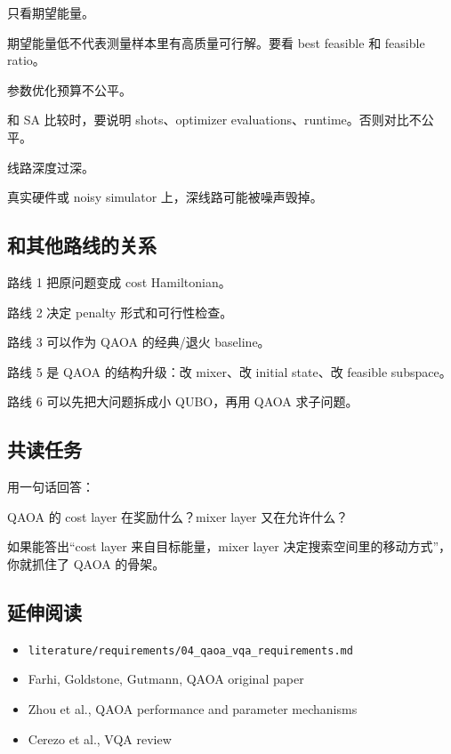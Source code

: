\documentclass[UTF8,12pt,a4paper]{ctexart}
\begin{document}
只看期望能量。

期望能量低不代表测量样本里有高质量可行解。要看 best feasible 和 feasible ratio。

参数优化预算不公平。

和 SA 比较时，要说明 shots、optimizer evaluations、runtime。否则对比不公平。

线路深度过深。

真实硬件或 noisy simulator 上，深线路可能被噪声毁掉。

\subsection*{和其他路线的关系}

路线 1 把原问题变成 cost Hamiltonian。

路线 2 决定 penalty 形式和可行性检查。

路线 3 可以作为 QAOA 的经典/退火 baseline。

路线 5 是 QAOA 的结构升级：改 mixer、改 initial state、改 feasible subspace。

路线 6 可以先把大问题拆成小 QUBO，再用 QAOA 求子问题。

\subsection*{共读任务}

用一句话回答：

\begin{GuideVerbatim}
QAOA 的 cost layer 在奖励什么？mixer layer 又在允许什么？
\end{GuideVerbatim}

如果能答出“cost layer 来自目标能量，mixer layer 决定搜索空间里的移动方式”，你就抓住了 QAOA 的骨架。

\subsection*{延伸阅读}

\begin{itemize}
\item \texttt{literature/requirements/04\_qaoa\_vqa\_requirements.md}
\item Farhi, Goldstone, Gutmann, QAOA original paper
\item Zhou et al., QAOA performance and parameter mechanisms
\item Cerezo et al., VQA review
\end{itemize}
\end{document}
